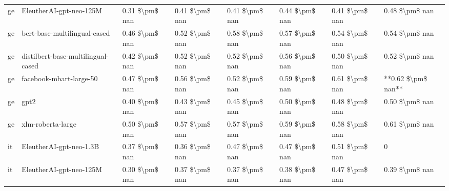 \begin{tabular}{llllllll}
      ge &            EleutherAI-gpt-neo-125M & 0.31 \$\textbackslash pm\$ nan &            0.41 \$\textbackslash pm\$ nan &        0.41 \$\textbackslash pm\$ nan &         0.44 \$\textbackslash pm\$ nan &                          0.41 \$\textbackslash pm\$ nan &     0.48 \$\textbackslash pm\$ nan \\
      ge &       bert-base-multilingual-cased & 0.46 \$\textbackslash pm\$ nan &            0.52 \$\textbackslash pm\$ nan &        0.58 \$\textbackslash pm\$ nan &         0.57 \$\textbackslash pm\$ nan &                          0.54 \$\textbackslash pm\$ nan &     0.54 \$\textbackslash pm\$ nan \\
      ge & distilbert-base-multilingual-cased & 0.42 \$\textbackslash pm\$ nan &            0.52 \$\textbackslash pm\$ nan &        0.52 \$\textbackslash pm\$ nan &         0.56 \$\textbackslash pm\$ nan &                          0.50 \$\textbackslash pm\$ nan &     0.52 \$\textbackslash pm\$ nan \\
      ge &            facebook-mbart-large-50 & 0.47 \$\textbackslash pm\$ nan &            0.56 \$\textbackslash pm\$ nan &        0.52 \$\textbackslash pm\$ nan &         0.59 \$\textbackslash pm\$ nan &                          0.61 \$\textbackslash pm\$ nan & **0.62 \$\textbackslash pm\$ nan** \\
      ge &                               gpt2 & 0.40 \$\textbackslash pm\$ nan &            0.43 \$\textbackslash pm\$ nan &        0.45 \$\textbackslash pm\$ nan &         0.50 \$\textbackslash pm\$ nan &                          0.48 \$\textbackslash pm\$ nan &     0.50 \$\textbackslash pm\$ nan \\
      ge &                  xlm-roberta-large & 0.50 \$\textbackslash pm\$ nan &            0.57 \$\textbackslash pm\$ nan &        0.57 \$\textbackslash pm\$ nan &         0.59 \$\textbackslash pm\$ nan &                          0.58 \$\textbackslash pm\$ nan &     0.61 \$\textbackslash pm\$ nan \\
      it &            EleutherAI-gpt-neo-1.3B & 0.37 \$\textbackslash pm\$ nan &            0.36 \$\textbackslash pm\$ nan &        0.47 \$\textbackslash pm\$ nan &         0.47 \$\textbackslash pm\$ nan &                          0.51 \$\textbackslash pm\$ nan &                  0 \\
      it &            EleutherAI-gpt-neo-125M & 0.30 \$\textbackslash pm\$ nan &            0.37 \$\textbackslash pm\$ nan &        0.37 \$\textbackslash pm\$ nan &         0.38 \$\textbackslash pm\$ nan &                          0.47 \$\textbackslash pm\$ nan &     0.39 \$\textbackslash pm\$ nan \\

\end{tabular}
